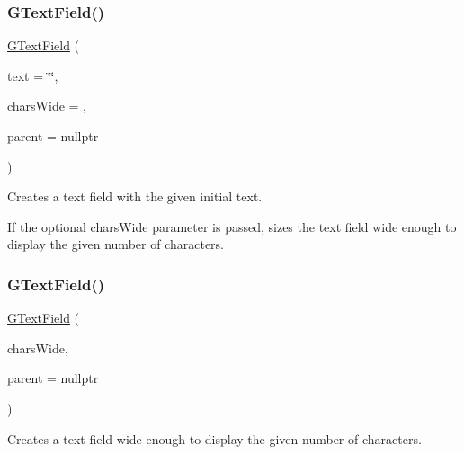 \subsubsection{\texorpdfstring{G\+Text\+Field()}{GTextField()}\hspace{0.1cm}{\footnotesize\ttfamily [1/4]}}
{\footnotesize\ttfamily \mbox{\hyperlink{classsgl_1_1GTextField}{G\+Text\+Field}} (\begin{DoxyParamCaption}\item[{const std\+::string \&}]{text = {\ttfamily \char`\"{}\char`\"{}},  }\item[{int}]{chars\+Wide = {},  }\item[{Q\+Widget $\ast$}]{parent = {\ttfamily nullptr} }\end{DoxyParamCaption})}



Creates a text field with the given initial text. 

If the optional chars\+Wide parameter is passed, sizes the text field wide enough to display the given number of characters. \mbox{\label{classsgl_1_1GTextField_a036419be062e4f447008a78dae22921c}} 
\subsubsection{\texorpdfstring{G\+Text\+Field()}{GTextField()}\hspace{0.1cm}{\footnotesize\ttfamily [2/4]}}
{\footnotesize\ttfamily \mbox{\hyperlink{classsgl_1_1GTextField}{G\+Text\+Field}} (\begin{DoxyParamCaption}\item[{int}]{chars\+Wide,  }\item[{Q\+Widget $\ast$}]{parent = {\ttfamily nullptr} }\end{DoxyParamCaption})}



Creates a text field wide enough to display the given number of characters. 

\mbox{\label{classsgl_1_1GTextField_a4caf2f90e21e32abf032c99a8c3f8efb}} 

